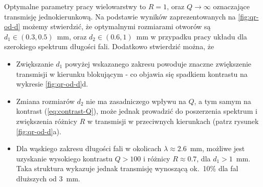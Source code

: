 Optymalne parametry pracy wielowarstwy to $R=1$, oraz $Q \to \infty$ oznaczające transmisję jednokierunkową. Na podstawie wyników zaprezentowanych na \ref{fig:qr-od-d} możemy stwierdzić, że optymalnymi rozmiarami otworów są $d_1\in(0.3,0.5)$~mm, oraz $d_2\in(0.6,1)$~mm w przypadku pracy układu dla szerokiego spektrum długości fali. Dodatkowo stwierdzić można, że
\begin{itemize}
	\item Zwiększanie $d_1$ powyżej wskazanego zakresu powoduje znaczne zwiększenie transmisji w kierunku blokującym - co objawia się spadkiem kontrastu na wykresie \ref{fig:qr-od-d}d.
	\item Zmiana rozmiarów $d_2$ nie ma zasadniczego wpływu na $Q$, a tym samym na kontrast (\ref{eq:contrast-Q}), może jednak prowadzić do poszerzenia spektrum i zwiększenia różnicy $R$ w transmisji w przeciwnych kierunkach (patrz rysunek \ref{fig:qr-od-d}a).
	\item Dla wąskiego zakresu długości fali w okolicach $\lambda\approx2.6$~mm, możliwe jest uzyskanie wysokiego kontrastu $Q>100$ i różnicy $R\approx 0.7$, dla $d_1>1$~mm. Taka struktura wykazuje jednak transmisję wynoszącą ok.~10\% dla fal dłuższych od $3$~mm\cite{stolarek2013broadband}.
\end{itemize}
